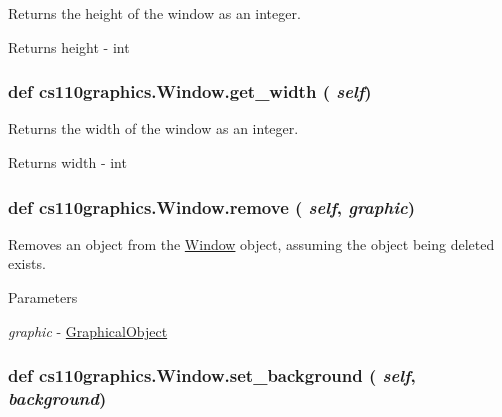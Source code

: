Returns the height of the window as an integer. \begin{DoxyReturn}{Returns}
height -\/ int 
\end{DoxyReturn}
\hypertarget{classcs110graphics_1_1Window_a41d27bb09f5033f0596af9f1a3a9b519}{
\subsubsection[{get\_\-width}]{\setlength{\rightskip}{0pt plus 5cm}def cs110graphics.Window.get\_\-width ( {\em self})}}
\label{classcs110graphics_1_1Window_a41d27bb09f5033f0596af9f1a3a9b519}


Returns the width of the window as an integer. \begin{DoxyReturn}{Returns}
width -\/ int 
\end{DoxyReturn}
\hypertarget{classcs110graphics_1_1Window_a14aba875d32f8a70a0c5a80ac3f18a92}{
\subsubsection[{remove}]{\setlength{\rightskip}{0pt plus 5cm}def cs110graphics.Window.remove ( {\em self}, \/   {\em graphic})}}
\label{classcs110graphics_1_1Window_a14aba875d32f8a70a0c5a80ac3f18a92}


Removes an object from the \hyperlink{classcs110graphics_1_1Window}{Window} object, assuming the object being deleted exists. 
\begin{DoxyParams}{Parameters}
\item[{\em graphic}]-\/ \hyperlink{classcs110graphics_1_1GraphicalObject}{GraphicalObject} \end{DoxyParams}
\hypertarget{classcs110graphics_1_1Window_a981a3115f1f22099549117313f38333c}{
\subsubsection[{set\_\-background}]{\setlength{\rightskip}{0pt plus 5cm}def cs110graphics.Window.set\_\-background ( {\em self}, \/   {\em background})}}
\label{classcs110graphics_1_1Window_a981a3115f1f22099549117313f38333c}


